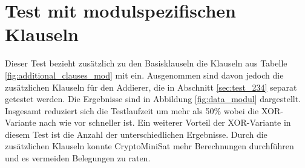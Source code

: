 \section{Test mit modulspezifischen Klauseln} %
\label{sec:test_modul}

Dieser Test bezieht zusätzlich zu den Basisklauseln die Klauseln aus Tabelle \ref{fig:additional_clauses_mod} mit ein.
Ausgenommen sind davon jedoch die zusätzlichen Klauseln für den Addierer, die in Abschnitt \ref{sec:test_234} separat getestet werden.
Die Ergebnisse sind in Abbildung \ref{fig:data_modul} dargestellt.
Insgesamt reduziert sich die Testlaufzeit um mehr als 50\% wobei die XOR-Variante nach wie vor schneller ist.
Ein weiterer Vorteil der XOR-Variante in diesem Test ist die Anzahl der unterschiedlichen Ergebnisse. Durch die zusätzlichen
Klauseln konnte CryptoMiniSat mehr Berechnungen durchführen und es vermeiden Belegungen zu raten.
